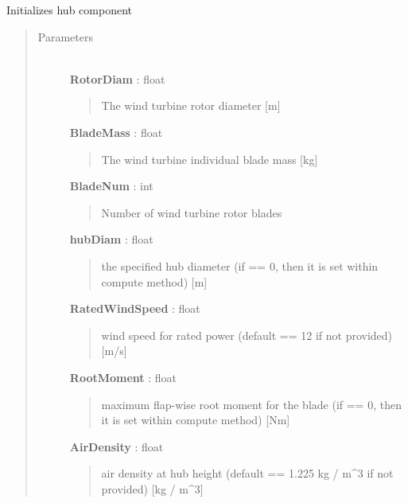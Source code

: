 \documentclass[letterpaper,10pt,openany,oneside]{sphinxmanual}
\begin{document}
\begin{fulllineitems}
\label{documentation:nacelleSE.src.hub_components.Hub}
Initializes hub component
\begin{quote}\begin{description}
\item[{Parameters }] \leavevmode\\
\textbf{RotorDiam} : float
\begin{quote}

The wind turbine rotor diameter {[}m{]}
\end{quote}

\textbf{BladeMass} : float
\begin{quote}

The wind turbine individual blade mass {[}kg{]}
\end{quote}

\textbf{BladeNum} : int
\begin{quote}

Number of wind turbine rotor blades
\end{quote}

\textbf{hubDiam} : float
\begin{quote}

the specified hub diameter (if == 0, then it is set within compute method) {[}m{]}
\end{quote}

\textbf{RatedWindSpeed} : float
\begin{quote}

wind speed for rated power (default == 12 if not provided) {[}m/s{]}
\end{quote}

\textbf{RootMoment} : float
\begin{quote}

maximum flap-wise root moment for the blade (if == 0, then it is set within compute method) {[}Nm{]}
\end{quote}

\textbf{AirDensity} : float
\begin{quote}

air density at hub height (default == 1.225 kg / m\textasciicircum{}3 if not provided) {[}kg / m\textasciicircum{}3{]}
\end{quote}


\end{description}
\end{quote}
\end{fulllineitems}
\end{document}
